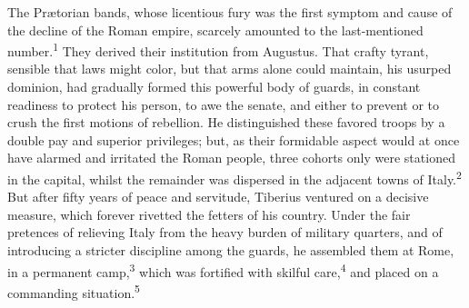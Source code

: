 The Prætorian bands, whose licentious fury was the first symptom
and cause of the decline of the Roman empire, scarcely amounted
to the last-mentioned number.\textsuperscript{1} They derived their institution
from Augustus. That crafty tyrant, sensible that laws might
color, but that arms alone could maintain, his usurped dominion,
had gradually formed this powerful body of guards, in constant
readiness to protect his person, to awe the senate, and either to
prevent or to crush the first motions of rebellion. He
distinguished these favored troops by a double pay and superior
privileges; but, as their formidable aspect would at once have
alarmed and irritated the Roman people, three cohorts only were
stationed in the capital, whilst the remainder was dispersed in
the adjacent towns of Italy.\textsuperscript{2} But after fifty years of peace and
servitude, Tiberius ventured on a decisive measure, which forever
rivetted the fetters of his country. Under the fair pretences of
relieving Italy from the heavy burden of military quarters, and
of introducing a stricter discipline among the guards, he
assembled them at Rome, in a permanent camp,\textsuperscript{3} which was
fortified with skilful care,\textsuperscript{4} and placed on a commanding
situation.\textsuperscript{5}






